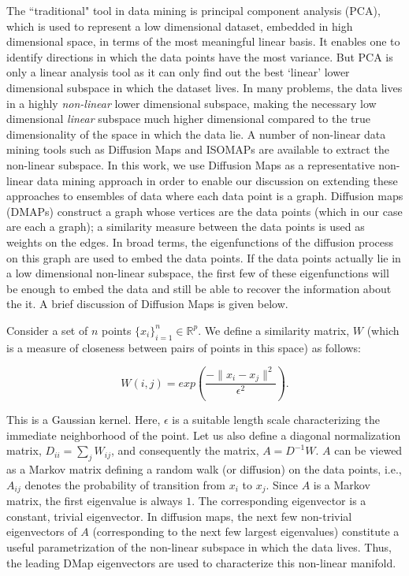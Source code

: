 The ``traditional" tool in data mining is principal component analysis
(PCA), which is used to represent a low
dimensional dataset, embedded in high dimensional space, in terms of
the most meaningful linear basis. It enables one to identify
directions in which the data points have the most variance. But PCA is
only a linear analysis tool as it can only find out the best `linear'
lower dimensional subspace in which the dataset lives. In many
problems, the data lives in a highly \textit{non-linear} lower
dimensional subspace, making the necessary low dimensional
\textit{linear} subspace much higher dimensional compared to the true
dimensionality of the space in which the data lie. A number of
non-linear data mining tools such as Diffusion Maps
\cite{nadler_diffusion_2005,nadler_diffusion_2006} and ISOMAPs \cite{tenenbaum_global_2000}
are available to extract the non-linear subspace.  In this work, we
use Diffusion Maps as a representative non-linear data mining approach
in order to enable our discussion on extending these approaches to
ensembles of data where each data point is a graph.
% 
Diffusion maps (DMAPs) construct a graph whose vertices are the data
points (which in our case are each a graph); a similarity measure
between the data points is used as weights on the edges. In broad
terms, the eigenfunctions of the diffusion process on this graph are
used to embed the data points. If the data points actually lie in a
low dimensional non-linear subspace, the first few of these
eigenfunctions will be enough to embed the data and still be able to
recover the information about the it. A brief discussion of Diffusion
Maps is given below.

Consider a set of $n$ points $\{x_i\}_{i=1}^n \in \mathbb{R}^p$. We
define a similarity matrix, $W$ (which is a measure of closeness
between pairs of points in this space) as follows:

\begin{equation}
  W(i,j) = exp \left( \frac{-\|x_i-x_j\|^2}{\epsilon^2} \right).
  \label{eq:sim}
\end{equation}

% 
This is a Gaussian kernel. Here, $\epsilon$ is a suitable length scale
characterizing the immediate neighborhood of the point. Let us also
define a diagonal normalization matrix, $D_{ii}=\sum_j W_{ij}$, and
consequently the matrix, $A=D^{-1} W$. $A$ can be viewed as a Markov
matrix defining a random walk (or diffusion) on the data points, i.e.,
$A_{ij}$ denotes the probability of transition from $x_i$ to
$x_j$. Since $A$ is a Markov matrix, the first eigenvalue is always
$1$. The corresponding eigenvector is a constant, trivial
eigenvector. In diffusion maps, the next few non-trivial eigenvectors
of $A$ (corresponding to the next few largest eigenvalues) constitute
a useful parametrization of the non-linear subspace in which the data
lives. Thus, the leading DMap eigenvectors are used to characterize
this non-linear manifold.


